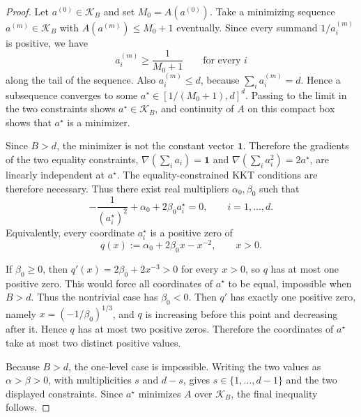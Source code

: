 \documentclass[11pt]{amsart}
\numberwithin{equation}{section}
\theoremstyle{definition}
\newcommand{\one}{\mathbf 1}
\begin{document}
\begin{proof}
Let \(a^{(0)}\in\mathcal K_B\) and set \(M_0=A(a^{(0)})\).  Take a minimizing
sequence \(a^{(m)}\in\mathcal K_B\) with \(A(a^{(m)})\le M_0+1\) eventually.
Since every summand \(1/a^{(m)}_i\) is positive, we have
\[
a^{(m)}_i\ge \frac{1}{M_0+1}
\qquad
\text{for every }i
\]
along the tail of the sequence.  Also \(a^{(m)}_i\le d\), because
\(\sum_i a^{(m)}_i=d\).  Hence a subsequence converges to some
\(a^\star\in[1/(M_0+1),d]^d\).  Passing to the limit in the two constraints
shows \(a^\star\in\mathcal K_B\), and continuity of \(A\) on this compact
box shows that \(a^\star\) is a minimizer.

Since \(B>d\), the minimizer is not the constant vector \(\one\).  Therefore
the gradients of the two equality constraints,
\(
\nabla(\sum_i a_i)=\one
\)
and
\(
\nabla(\sum_i a_i^2)=2a^\star
\),
are linearly independent at \(a^\star\).  The equality-constrained KKT
conditions are therefore necessary.  Thus there exist real multipliers
\(\alpha_0,\beta_0\) such that
\[
-\frac{1}{(a_i^\star)^2}+\alpha_0+2\beta_0 a_i^\star=0,
\qquad i=1,\dots,d.
\]
Equivalently, every coordinate \(a_i^\star\) is a positive zero of
\[
q(x):=\alpha_0+2\beta_0 x-x^{-2},
\qquad x>0.
\]

If \(\beta_0\ge 0\), then \(q'(x)=2\beta_0+2x^{-3}>0\) for every \(x>0\), so
\(q\) has at most one positive zero.  This would force all coordinates of
\(a^\star\) to be equal, impossible when \(B>d\).
Thus the nontrivial case has \(\beta_0<0\).  Then \(q'\) has exactly one
positive zero, namely \(x=(-1/\beta_0)^{1/3}\), and \(q\) is increasing before
this point and decreasing after it.  Hence \(q\) has at most two positive
zeros.  Therefore the coordinates of \(a^\star\) take at most two distinct
positive values.

Because \(B>d\), the one-level case is impossible.  Writing the two values as
\(\alpha>\beta>0\), with multiplicities \(s\) and \(d-s\), gives
\(s\in\{1,\dots,d-1\}\) and the two displayed constraints.  Since
\(a^\star\) minimizes \(A\) over \(\mathcal K_B\), the final inequality follows.
\end{proof}
\end{document}
